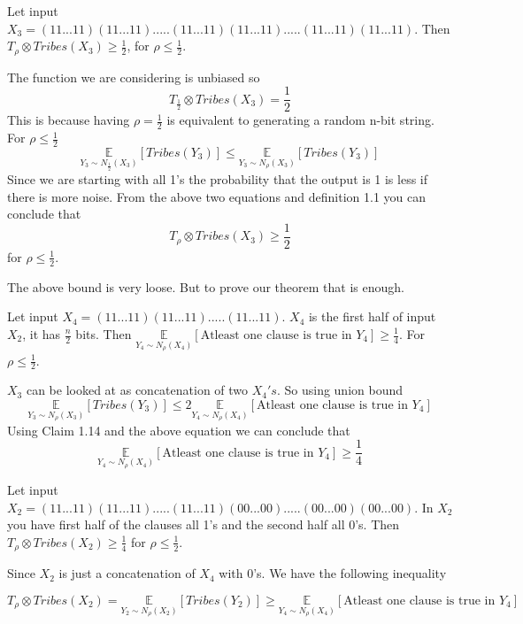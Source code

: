 \documentclass[11pt]{article}
\begin{document}
\EPF

\BCM
Let input $X_3 = (11...11)(11...11).....(11...11)(11...11).....(11...11)(11...11)$. Then $T_{\rho} \otimes Tribes(X_3) \geq \frac{1}{2}$, for $\rho \leq \frac{1}{2}$.
\ECM

\BPF
The function we are considering is unbiased so 
$$T_{\frac{1}{2}} \otimes Tribes(X_3) = \frac{1}{2}$$
This is because having $\rho = \frac{1}{2}$ is equivalent to generating a random n-bit string. For $\rho \leq \frac{1}{2}$ 
$$\underset{Y_3 \sim N_{\frac{1}{2}}(X_3)}{\mathbb{E}}[Tribes(Y_3)] \leq \underset{Y_3 \sim N_{\rho}(X_3)}{\mathbb{E}}[Tribes(Y_3)]$$
Since we are starting with all 1's the probability that the output is 1 is less if there is more noise. From the above two equations and definition 1.1 you can conclude that 
$$T_{\rho} \otimes Tribes(X_3) \geq \frac{1}{2}$$ for $\rho \leq \frac{1}{2}$.
 
\EPF

The above bound is very loose. But to prove our theorem that is enough.

\BCM
Let input $X_4 = (11...11)(11...11).....(11...11)$. $X_4$ is the first half of input $X_2$, it has $\frac{n}{2}$ bits. Then $\underset{Y_4 \sim N_{\rho}(X_4)}{\mathbb{E}}[\text{Atleast one clause is true in }Y_4] \geq \frac{1}{4}$. For $\rho \leq \frac{1}{2}$.

\ECM

\BPF
$X_3$ can be looked at as concatenation of two $X_4 {'} s$. So using union bound
$$\underset{Y_3 \sim N_{\rho}(X_3)}{\mathbb{E}}[Tribes(Y_3)] \leq 2\underset{Y_4 \sim N_{\rho}(X_4)}{\mathbb{E}}[\text{Atleast one clause is true in }Y_4]$$
Using Claim 1.14 and the above equation we can conclude that
$$\underset{Y_4 \sim N_{\rho}(X_4)}{\mathbb{E}}[\text{Atleast one clause is true in }Y_4] \geq \frac{1}{4}$$
 

\EPF




\BCM
Let input $X_2 = (11...11)(11...11).....(11...11)(00...00).....(00...00)(00...00)$. In $X_2$ you have first half of the clauses all 1's and the second half all 0's. Then $T_{\rho} \otimes Tribes(X_2) \geq \frac{1}{4}$ for $\rho \leq \frac{1}{2}$.

\ECM

\BPF
Since $X_2$ is just a concatenation of $X_4$ with 0's. We have the following inequality

$$T_{\rho} \otimes Tribes(X_2) = \underset{Y_2 \sim N_{\rho}(X_2)}{\mathbb{E}}[Tribes(Y_2)]  \geq \underset{Y_4 \sim N_{\rho}(X_4)}{\mathbb{E}}[\text{Atleast one clause is true in }Y_4]$$
\end{document}

